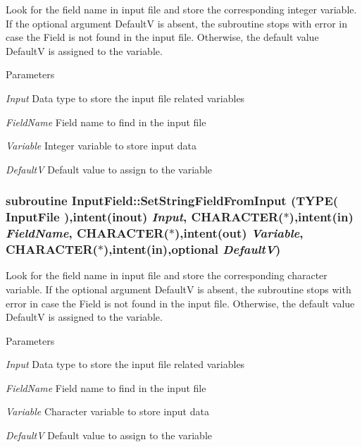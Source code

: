 Look for the field name in input file and store the corresponding integer variable. If the optional argument DefaultV is absent, the subroutine stops with error in case the Field is not found in the input file. Otherwise, the default value DefaultV is assigned to the variable. 
\begin{DoxyParams}{Parameters}
\item[{\em Input}]Data type to store the input file related variables \item[{\em FieldName}]Field name to find in the input file \item[{\em Variable}]Integer variable to store input data \item[{\em DefaultV}]Default value to assign to the variable \end{DoxyParams}
\hypertarget{namespace_input_field_a6238d310b4f7c163dd317b81bb279393}{
\subsubsection[{SetStringFieldFromInput}]{\setlength{\rightskip}{0pt plus 5cm}subroutine InputField::SetStringFieldFromInput (TYPE( InputFile ),intent(inout) {\em Input}, \/  CHARACTER($\ast$),intent(in) {\em FieldName}, \/  CHARACTER($\ast$),intent(out) {\em Variable}, \/  CHARACTER($\ast$),intent(in),optional {\em DefaultV})}}
\label{namespace_input_field_a6238d310b4f7c163dd317b81bb279393}


Look for the field name in input file and store the corresponding character variable. If the optional argument DefaultV is absent, the subroutine stops with error in case the Field is not found in the input file. Otherwise, the default value DefaultV is assigned to the variable. 
\begin{DoxyParams}{Parameters}
\item[{\em Input}]Data type to store the input file related variables \item[{\em FieldName}]Field name to find in the input file \item[{\em Variable}]Character variable to store input data \item[{\em DefaultV}]Default value to assign to the variable \end{DoxyParams}


